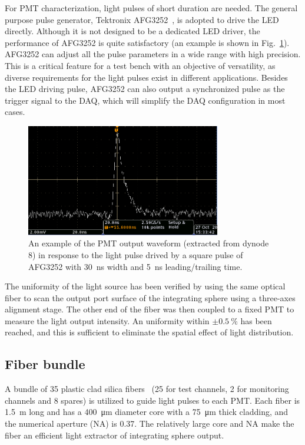 \documentclass{nst}
\providecommand{\DIFadd}[1]{{\protect\color{yellow} \sf #1}} %
\providecommand{\DIFaddbegin}{} %
\providecommand{\DIFaddend}{} %
\providecommand{\DIFdelbegin}{} %
\providecommand{\DIFdelend}{} %
\begin{document}
For PMT characterization, light pulses of short duration are needed.
The general purpose pulse generator, Tektronix AFG3252~\cite{afg3252}, is adopted to drive the LED directly.
Although it is not designed to be a dedicated LED driver, the performance of AFG3252 is quite satisfactory (an example is shown in Fig.~\ref{fig:FIG4}).
AFG3252 can adjust all the pulse parameters in a wide range with high precision. This is a critical feature for a test bench with an objective of versatility, as diverse requirements for the light pulses exist in different applications. 
Besides the LED driving pulse, AFG3252 can also output a synchronized pulse as the trigger signal to the DAQ, which will simplify the DAQ configuration in most cases. 

\begin{figure}[!htb]
	\centering
	\includegraphics[width=85mm]{FIG4.jpg}
	\caption{An example of the PMT output waveform (extracted from dynode 8) in response to the light pulse drived by a square pulse of AFG3252 with \SI{30}{\nano\second} width and \SI{5}{\nano\second} leading/trailing time.}
	\label{fig:FIG4}
\end{figure} 

The uniformity of the light source has been verified by using the same optical fiber to scan the output port surface of the integrating sphere using a three-axes alignment stage. The other end of the fiber was then coupled to a fixed PMT to measure the light output intensity.
An uniformity within $\pm\SI{0.5}{\percent}$ has been reached, and this is sufficient to eliminate the spatial effect of light distribution.

\subsection{Fiber bundle}
\label{sec:fiber_bundle}

A bundle of 35 plastic clad silica fibers~\cite{optical_fibre} (25 for test channels, 2 for monitoring channels and 8 spares) is utilized to \DIFdelbegin \DIFdelend \DIFaddbegin \DIFadd{guide }\DIFaddend light pulses to each PMT.	Each fiber is \SI{1.5}{\meter} long and has a \SI{400}{\micro\meter} diameter core with a \SI{75}{\micro\meter} thick cladding, and the numerical aperture (NA) is 0.37.
The relatively large core and NA make the fiber an efficient light extractor of integrating sphere output. 
\end{document}
